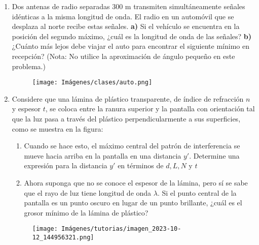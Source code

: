 \documentclass[letterpaper,11pt]{article}
\begin{document}
\begin{enumerate}\setlength{\itemsep}{0.4cm}


\item 
\begin{multicols}{2}
 Dos antenas de radio separadas 300 m transmiten simultáneamente señales idénticas a la misma longitud de onda. El radio en un automóvil que se desplaza al norte recibe estas señales. \textbf{a)} Si el vehículo se encuentra en la posición del segundo máximo, ¿cuál es la longitud de onda de las señales? \textbf{b)} ¿Cuánto más lejos debe viajar el auto para encontrar el siguiente mínimo en recepción? (Nota: No utilice la aproximación de ángulo pequeño en este problema.)

    \columnbreak
    
    \begin{figure}[H]
        \centering
        \texttt{[image: Imágenes/clases/auto.png]}
    \end{figure}
\end{multicols}

\item Considere que una lámina de plástico transparente, de índice de refracción $n$ y espesor $t$, se coloca entre la ranura superior y la pantalla con orientación tal que la luz pasa a través del plástico perpendicularmente a sus superficies, como se muestra en la figura:

\begin{multicols}{2}
    \begin{enumerate}
        \item Cuando se hace esto, el máximo central del patrón de interferencia se mueve hacia arriba en la pantalla en una distancia $y'$. Determine una expresión para la distancia $y'$ en términos de $d, L, N \text{ y } t$
    
        \item Ahora suponga que no se conoce el espesor de la lámina, pero sí se sabe que el rayo de luz tiene longitud de onda $\lambda$. Si el punto central de la pantalla es un punto oscuro en lugar de un punto brillante, ¿cuál es el grosor mínimo de la lámina de plástico?
    \end{enumerate}
    \columnbreak
    \begin{figure}[H]
        \centering
        \texttt{[image: Imágenes/tutorias/imagen\_2023-10-12\_144956321.png]}
    \end{figure}
\end{multicols}


\end{enumerate}
\end{document}
